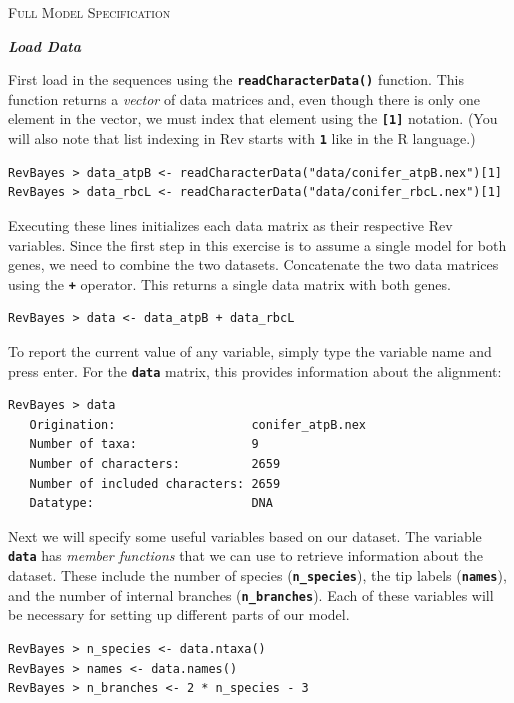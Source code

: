 \documentclass[11pt]{article}
\newcommand{\cl}[1]{{\texttt{\textbf{#1}}}}
\begin{document}
\bigskip
{\large \textcolor{mycol}{\textsc{Full Model Specification}}}

\textbf{\textit{Load Data}}

First load in the sequences using the \cl{readCharacterData()} function. This function returns a \textit{vector} of data matrices and, even though there is only one element in the vector, we must index that element using the \cl{[1]} notation. (You will also note that list indexing in Rev starts with \cl{1} like in the R language.)
{\tt \begin{snugshade*}
\begin{lstlisting}
RevBayes > data_atpB <- readCharacterData("data/conifer_atpB.nex")[1]
RevBayes > data_rbcL <- readCharacterData("data/conifer_rbcL.nex")[1]
\end{lstlisting}
\end{snugshade*}}
Executing these lines initializes each data matrix as their respective Rev variables. 
Since the first step in this exercise is to assume a single model for both genes, we need to combine the two datasets.
Concatenate the two data matrices using the \cl{+} operator. This returns a single data matrix with both genes.

{\tt \begin{snugshade*}
\begin{lstlisting}
RevBayes > data <- data_atpB + data_rbcL
\end{lstlisting}
\end{snugshade*}}

To report the current value of any variable, simply type the variable name and press enter. For the \cl{data} matrix, this provides information about the alignment:


{\tt \begin{snugshade*}
\begin{lstlisting}
RevBayes > data
   Origination:                   conifer_atpB.nex
   Number of taxa:                9
   Number of characters:          2659
   Number of included characters: 2659
   Datatype:                      DNA
\end{lstlisting}
\end{snugshade*}}


Next we will specify some useful variables based on our dataset. The variable \cl{data} has \textit{member functions} that we can use to retrieve information about the dataset. 
These include the number of species (\cl{n\_species}), the tip labels (\cl{names}), and the number of internal branches (\cl{n\_branches}).
Each of these variables will be necessary for setting up different parts of our model.
{\tt \begin{snugshade*}
\begin{lstlisting}
RevBayes > n_species <- data.ntaxa()
RevBayes > names <- data.names()	
RevBayes > n_branches <- 2 * n_species - 3 
\end{lstlisting}
\end{snugshade*}}
\end{document}
